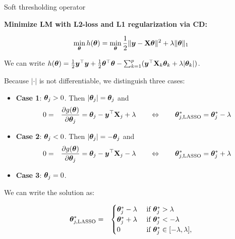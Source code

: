 \documentclass[11pt,compress,t,notes=noshow, xcolor=table]{beamer}
\begin{document}
\begin{vbframe}{Soft thresholding operator}

\textbf{Minimize LM with L2-loss and L1 regularization via CD:}

$$
    \min_{\thetab} h(\thetab) = \min_{\thetab} \frac{1}{2}\|\bm{y} - \Xmat \thetab\|^2 + \lambda \|\thetab\|_1 %
$$

We can write $h(\bm{\theta}) = \frac{1}{2}\bm{y}^\top \bm{y} + \frac{1}{2}\bm{\theta}^\top \bm{\theta}  - \sum_{k = 1}^p (\bm{y}^\top \mathbf{X}_k \bm{\theta}_k + \lambda|\bm{\theta}_k|)$. 

\vspace*{0.3cm}

Because $|\cdot|$ is not differentiable, we distinguish three cases: 

\begin{footnotesize}
    \begin{itemize}
        \item \textbf{Case 1}: $\bm{\theta}_j > 0$. Then $|\bm{\theta}_j| = \bm{\theta}_j$ and 
        \begin{eqnarray*}
            0 &=& \frac{\partial{g}(\bm{\theta})}{\partial \bm{\theta}_j} = \bm{\theta}_j - \bm{y}^\top \mathbf{X}_j + \lambda \qquad \Leftrightarrow \qquad \bm{\theta}^\ast_{j, \text{LASSO}} = \bm{\theta}^\ast_j - \lambda        
            \end{eqnarray*}
        \item \textbf{Case 2}: $\bm{\theta}_j < 0$. Then $|\bm{\theta}_j| = - \bm{\theta}_j$ and 
        \begin{eqnarray*}
            0 &=& \frac{\partial{g}(\bm{\theta})}{\partial \bm{\theta}_j} = \bm{\theta}_j - \bm{y}^\top \mathbf{X}_j - \lambda \qquad \Leftrightarrow \qquad \bm{\theta}^\ast_{j, \text{LASSO}} = \bm{\theta}^\ast_j + \lambda        
            \end{eqnarray*}
        \item \textbf{Case 3}: $\bm{\theta}_j = 0$. 
    \end{itemize}
\end{footnotesize}

We can write the solution as: 

\begin{eqnarray*}
    \bm{\theta}^\ast_{j, \text{LASSO}} &=& 
    \begin{cases}
        \bm{\theta}^\ast_j - \lambda & \text{ if } \bm{\theta}^\ast_j > \lambda \\
        \bm{\theta}^\ast_j + \lambda & \text{ if } \bm{\theta}^\ast_j < - \lambda \\
        0 &  \text{ if }  \bm{\theta}^\ast_j \in [- \lambda, \lambda],
    \end{cases}
\end{eqnarray*}


\end{vbframe}
\end{document}
